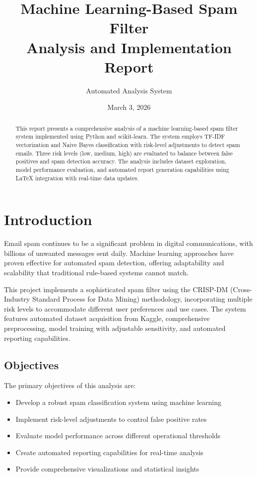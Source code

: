 \documentclass[12pt,a4paper]{article}
\title{\textbf{Machine Learning-Based Spam Filter}\\ 
       \large Analysis and Implementation Report}
\author{Automated Analysis System}
\date{March 3, 2026}
\begin{document}
\maketitle

\begin{abstract}
This report presents a comprehensive analysis of a machine learning-based spam filter system implemented using Python and scikit-learn. The system employs TF-IDF vectorization and Naive Bayes classification with risk-level adjustments to detect spam emails. Three risk levels (low, medium, high) are evaluated to balance between false positives and spam detection accuracy. The analysis includes dataset exploration, model performance evaluation, and automated report generation capabilities using LaTeX integration with real-time data updates.
\end{abstract}

\tableofcontents
\newpage

\section{Introduction}

Email spam continues to be a significant problem in digital communications, with billions of unwanted messages sent daily. Machine learning approaches have proven effective for automated spam detection, offering adaptability and scalability that traditional rule-based systems cannot match.

This project implements a sophisticated spam filter using the CRISP-DM (Cross-Industry Standard Process for Data Mining) methodology, incorporating multiple risk levels to accommodate different user preferences and use cases. The system features automated dataset acquisition from Kaggle, comprehensive preprocessing, model training with adjustable sensitivity, and automated reporting capabilities.

\subsection{Objectives}

The primary objectives of this analysis are:

\begin{itemize}
    \item Develop a robust spam classification system using machine learning
    \item Implement risk-level adjustments to control false positive rates
    \item Evaluate model performance across different operational thresholds
    \item Create automated reporting capabilities for real-time analysis
    \item Provide comprehensive visualizations and statistical insights
\end{itemize}
\end{document}
